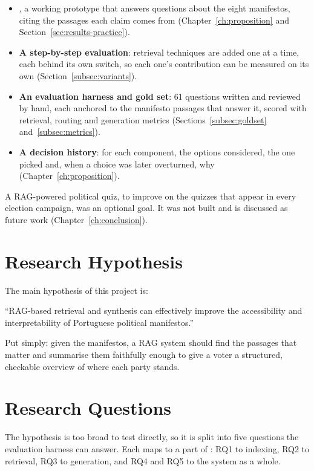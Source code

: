 \begin{itemize}
    \item \textbf{\sysname{}}, a working prototype that answers questions about the eight manifestos, citing the passages each claim comes from (Chapter~\ref{ch:proposition} and Section~\ref{sec:results-practice}).
    \item \textbf{A step-by-step evaluation}: retrieval techniques are added one at a time, each behind its own switch, so each one's contribution can be measured on its own (Section~\ref{subsec:variants}).
    \item \textbf{An evaluation harness and gold set}: 61 questions written and reviewed by hand, each anchored to the manifesto passages that answer it, scored with retrieval, routing and generation metrics (Sections~\ref{subsec:goldset} and~\ref{subsec:metrics}).
    \item \textbf{A decision history}: for each component, the options considered, the one picked and, when a choice was later overturned, why (Chapter~\ref{ch:proposition}).
\end{itemize}

A RAG-powered political quiz, to improve on the quizzes that appear in every election campaign, was an optional goal. It was not built and is discussed as future work (Chapter~\ref{ch:conclusion}).

\section{Research Hypothesis}

The main hypothesis of this project is:

“RAG-based retrieval and synthesis can effectively improve the accessibility and interpretability of Portuguese political manifestos.”

Put simply: given the manifestos, a RAG system should find the passages that matter and summarise them faithfully enough to give a voter a structured, checkable overview of where each party stands.

\section{Research Questions} \label{sec:research-questions}

The hypothesis is too broad to test directly, so it is split into five questions the evaluation harness can answer. Each maps to a part of \sysname{}: RQ1 to indexing, RQ2 to retrieval, RQ3 to generation, and RQ4 and RQ5 to the system as a whole.

